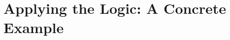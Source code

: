 \documentclass[letterpaper]{article}
\theoremstyle{definition}
\begin{document}





\section{Applying the Logic: A Concrete Example}
\label{sec:concrete}
\end{document}
